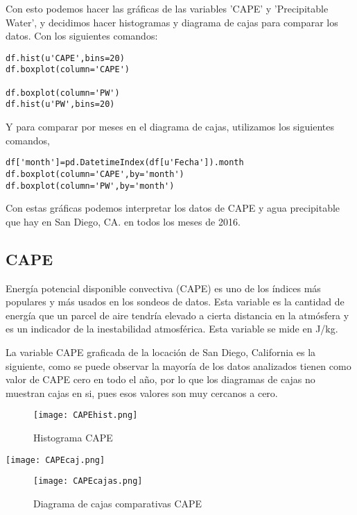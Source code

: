 \documentclass[12pt]{article}
\begin{document}
Con esto podemos hacer las gráficas de las variables 'CAPE' y 'Precipitable Water', y decidimos hacer histogramas y diagrama de cajas para comparar los datos. Con los siguientes comandos:

\begin{verbatim}
df.hist(u'CAPE',bins=20)
df.boxplot(column='CAPE')

df.boxplot(column='PW')
df.hist(u'PW',bins=20)
\end{verbatim}

Y para comparar por meses en el diagrama de cajas, utilizamos los siguientes comandos,

\begin{verbatim}
df['month']=pd.DatetimeIndex(df[u'Fecha']).month
df.boxplot(column='CAPE',by='month')
df.boxplot(column='PW',by='month')
\end{verbatim}

Con estas gráficas podemos interpretar los datos de CAPE y agua precipitable que hay en San Diego, CA. en todos los meses de 2016.

\subsection{\textsc{CAPE}}
Energía potencial disponible convectiva (CAPE) es uno de los índices más populares y más usados en los sondeos de datos. Esta variable es la cantidad de energía que un parcel de aire tendría elevado a cierta distancia en la atmósfera y es un indicador de la inestabilidad atmosférica. Esta variable se mide en J/kg.

La variable CAPE graficada de la locación de San Diego, California es la siguiente, como se puede observar la mayoría de los datos analizados tienen como valor de CAPE cero en todo el año, por lo que los diagramas de cajas no muestran cajas en si, pues esos valores son muy cercanos a cero. \\

\begin{figure}[h]
\centering
\texttt{[image: CAPEhist.png]}
\caption{Histograma CAPE}
\end{figure}

\begin{center}
\texttt{[image: CAPEcaj.png]}
\end{center}

\begin{figure}[!ht]
\centering
\texttt{[image: CAPEcajas.png]}
\caption{Diagrama de cajas comparativas CAPE}
\end{figure} 
\end{document}
